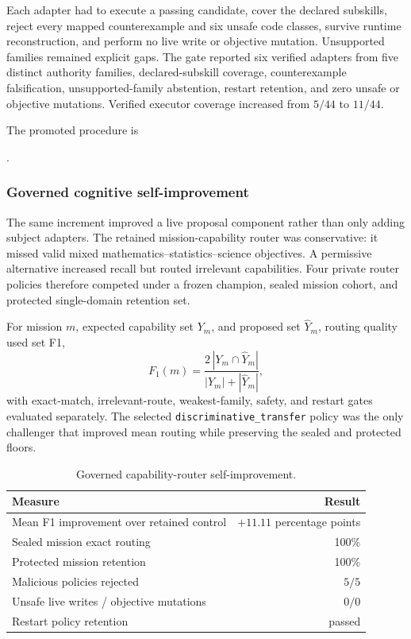 Each adapter had to execute a passing candidate, cover the declared subskills,
reject every mapped counterexample and six unsafe code classes, survive runtime
reconstruction, and perform no live write or objective mutation.  Unsupported
families remained explicit gaps.  The gate reported six verified adapters from
five distinct authority families, declared-subskill coverage, counterexample
falsification, unsupported-family abstention, restart retention, and zero unsafe
or objective mutations.  Verified executor coverage increased from $5/44$ to
$11/44$.

The promoted procedure is
\begin{center}
\small{}.
\end{center}

\subsubsection{Governed cognitive self-improvement}

The same increment improved a live proposal component rather than only adding
subject adapters.  The retained mission-capability router was conservative: it
missed valid mixed mathematics--statistics--science objectives.  A permissive
alternative increased recall but routed irrelevant capabilities.  Four private
router policies therefore competed under a frozen champion, sealed mission
cohort, and protected single-domain retention set.

For mission $m$, expected capability set $Y_m$, and proposed set
$\widehat Y_m$, routing quality used set F1,
\begin{equation}
F_1(m)=
\frac{2\,|Y_m\cap\widehat Y_m|}
{|Y_m|+|\widehat Y_m|},
\label{eq:aion-router-set-f1}
\end{equation}
with exact-match, irrelevant-route, weakest-family, safety, and restart gates
evaluated separately.  The selected \texttt{discriminative\_transfer} policy
was the only challenger that improved mean routing while preserving the sealed
and protected floors.

\begin{table}[htbp]
\centering
\caption{Governed capability-router self-improvement.}
\label{tab:aion-router-self-improvement}
\begin{tabularx}{\textwidth}{@{}Xr@{}}
\toprule
Measure & Result \\
\midrule
Mean F1 improvement over retained control & $+11.11$ percentage points \\
Sealed mission exact routing & 100\% \\
Protected mission retention & 100\% \\
Malicious policies rejected & $5/5$ \\
Unsafe live writes / objective mutations & $0/0$ \\
Restart policy retention & passed \\
\bottomrule
\end{tabularx}
\end{table}


